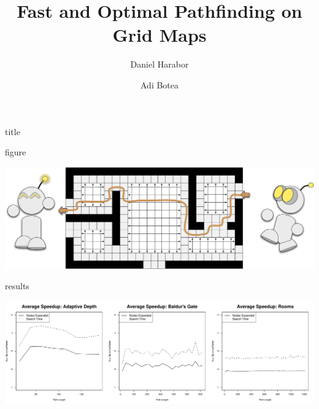\documentclass[a0,landscape]{a0poster}
\title{Fast and Optimal Pathfinding on Grid Maps}
\date{}%
\author{Daniel Harabor\protect\footnotemark[1]
\and
Adi Botea\protect\footnotemark[1]}
\begin{document}
\begin{staticcontents*}{title}
\maketitle
\end{staticcontents*}
\thispagestyle{empty} 







\begin{staticcontents*}{figure}
\begin{staticfigure}
\begin{center}
\includegraphics[width=\textwidth]{diagrams/robot_splash2}
\end{center}
\end{staticfigure}
\end{staticcontents*}

\begin{staticcontents*}{results}
\begin{staticfigure}
\begin{center}
\includegraphics[width=\textwidth]{diagrams/speedup}
\end{center}
\end{staticfigure}
\end{staticcontents*}
\end{document}
